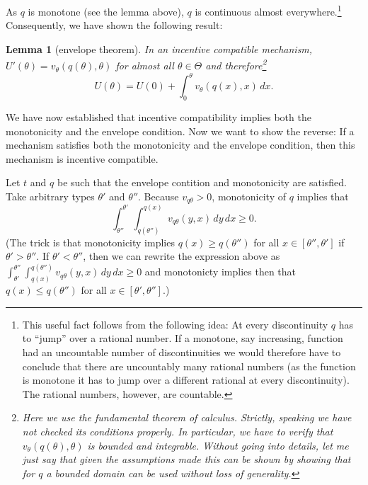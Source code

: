 \documentclass[12pt]{article}
\newtheorem{lemma}{Lemma}
\begin{document}
As $q$ is monotone (see the lemma above), $q$ is continuous almost everywhere.\footnote{This useful fact follows from the following idea: At every discontinuity $q$ has to ``jump'' over a rational number. If a monotone, say increasing, function had an uncountable number of discontinuities we would therefore have to conclude that there are uncountably many rational numbers (as the function is monotone it has to jump over a different rational at every discontinuity). The rational numbers, however, are countable.  } Consequently, we have shown the following result:
\begin{lemma}[envelope theorem]
  In an incentive compatible mechanism, $U'(\theta )=v_\theta (q(\theta ),\theta )$ for almost all $\theta \in\Theta $ and therefore\footnote{Here we use the fundamental theorem of calculus. Strictly, speaking we have not checked its conditions properly. In particular, we have to verify that $v_\theta (q(\theta ),\theta )$ is bounded and integrable. Without going into details, let me just say that given the assumptions made this can be shown by showing that for $q$ a bounded domain can be used without loss of generality.}
  \begin{equation*}
    U(\theta )=U(0)+\int_0^\theta v_\theta (q(x),x)\,dx.
  \end{equation*}
\end{lemma}

We have now established that incentive compatibility implies both the monotonicity and the envelope condition. Now we want to show the reverse: If a mechanism satisfies both the monotonicity and the envelope condition, then this mechanism is incentive compatible.

Let $t$ and $q$ be such that the envelope contition and monotonicity are satisfied. Take arbitrary types $\theta '$ and $\theta ''$. Because $v_{q\theta }>0$, monotonicity of $q$ implies that
\begin{equation}\label{eq:3}
  \int_{\theta ''}^{\theta '}\int_{q(\theta '')}^{q(x)}v_{q\theta }(y,x)\,dy\,dx\geq 0.
\end{equation}
(The trick is that monotonicity implies $q(x)\geq q(\theta '')$ for all $x\in[\theta '',\theta ']$ if $\theta '>\theta ''$. If $\theta '<\theta ''$, then we can rewrite the expression above as $\int_{\theta '}^{\theta ''}\int^{q(\theta '')}_{q(x)}v_{q\theta }(y,x)\,dy\,dx\geq 0$ and monotonicty implies then that $q(x)\leq q(\theta '')$ for all $x\in[\theta ',\theta '']$.) 
\end{document}
